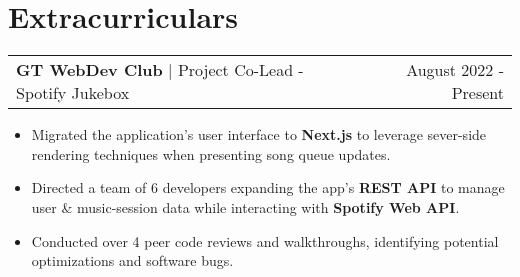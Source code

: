 \documentclass[letterpaper,11pt]{article}
\makeatletter
\newcommand{\resumeExperienceHeading}[3]{
    \begin{tabular*}{0.99\textwidth}[t]{l@{\extracolsep{\fill}}r}
      \textbf{#1} $\vert$ {#2} & {#3} \\
    \end{tabular*}\vspace{-3pt}
}
\newcommand{\resumeProjectHeading}[3]{
    \begin{tabular*}{0.97\textwidth}[t]{l@{\extracolsep{\fill}}r}
      \textbf{#1} $\vert$ \textit{#2}  & {#3}
    \end{tabular*}\vspace{-3pt}
}
\newcommand{\resumeItemListStart}{\begin{itemize}[noitemsep]\vspace{-4pt}}
\newcommand{\resumeItemListEnd}{\end{itemize}}
\makeatother
\begin{document}

\section{Extracurriculars}
  \resumeExperienceHeading{GT WebDev Club}{Project Co-Lead - Spotify Jukebox}{August 2022 - Present}
    \resumeItemListStart
      \item {Migrated the application's user interface to \textbf{Next.js} to leverage sever-side rendering techniques when presenting song queue updates.}
      \item {Directed a team of 6 developers expanding the app's \textbf{REST API} to manage user \& music-session data while interacting with \textbf{Spotify Web API}.}
      \item {Conducted over 4 peer code reviews and walkthroughs, identifying potential optimizations and software bugs.}
    \resumeItemListEnd
\end{document}
